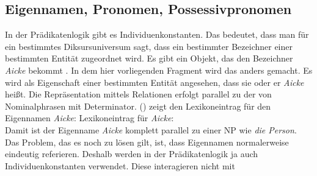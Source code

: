\subsection{Eigennamen, Pronomen, Possessivpronomen}

In der Prädikatenlogik gibt es Individuenkonstanten. Das bedeutet, dass man für ein bestimmtes
Diksursuniversum sagt, dass ein bestimmter Bezeichner einer bestimmten Entität zugeordnet wird. Es
gibt ein Objekt, das den Bezeichner \emph{Aicke} bekommt \citep[68]{AAD73a}. In dem hier
vorliegenden Fragment wird das anders gemacht. Es wird als Eigenschaft einer bestimmten Entität
angesehen, dass sie oder er \emph{Aicke} heißt. Die Repräsentation mittels Relationen erfolgt
parallel zu der von Nominalphrasen mit Determinator. () zeigt den Lexikoneintrag für den
Eigennamen \emph{Aicke}:
\eas
Lexikoneintrag für \emph{Aicke}:\\
\zs
Damit ist der Eigenname \emph{Aicke} komplett parallel zu einer NP wie \emph{die Person}. Das
Problem, das es noch zu lösen gilt, ist, dass Eigennamen normalerweise eindeutig referieren. Deshalb
werden in der Prädikatenlogik ja auch Individuenkonstanten verwendet. Diese interagieren nicht mit
